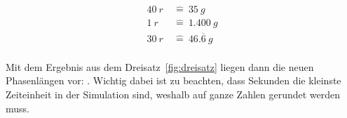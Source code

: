 \begin{align}
    40~\unit{r}~&\widehat{=}~35~\unit{g} \\
    1~\unit{r}~&\widehat{=}~1.400~\unit{g} \\
    30~\unit{r}~&\widehat{=}~46.\overline{6}~\unit{g} \\
\end{align}
\label{fig:dreisatz}

Mit dem Ergebnis aus dem Dreisatz~\ref{fig:dreisatz} liegen dann die neuen Phasenlängen vor: .
Wichtig dabei ist zu beachten, dass Sekunden die kleinste Zeiteinheit in der Simulation sind, weshalb auf ganze Zahlen gerundet werden muss.
